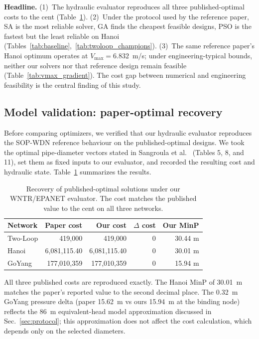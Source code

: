\documentclass[conference]{IEEEtran}
\begin{document}
\textbf{Headline.} (1)~The hydraulic evaluator reproduces all three published-optimal costs to the cent (Table~\ref{tab:validation}). (2)~Under the protocol used by the reference paper, SA is the most reliable solver, GA finds the cheapest feasible designs, PSO is the fastest but the least reliable on Hanoi (Tables~\ref{tab:baseline},~\ref{tab:twoloop_champions}). (3)~The same reference paper's Hanoi optimum operates at $V_{\max}=6.832$~m/s; under engineering-typical bounds, neither our solvers nor that reference design remain feasible (Table~\ref{tab:vmax_gradient}). The cost gap between numerical and engineering feasibility is the central finding of this study.

\subsection{Model validation: paper-optimal recovery}
\label{sec:validation}
Before comparing optimizers, we verified that our hydraulic evaluator reproduces the SOP-WDN reference behaviour on the published-optimal designs. We took the optimal pipe-diameter vectors stated in Sangroula et al.~\cite{sangroula2022} (Tables 5, 8, and 11), set them as fixed inputs to our evaluator, and recorded the resulting cost and hydraulic state. Table~\ref{tab:validation} summarizes the results.

\begin{table}[t]
\caption{Recovery of published-optimal solutions under our WNTR/EPANET evaluator. The cost matches the published value to the cent on all three networks.}
\label{tab:validation}
\centering
\begin{tabular}{lrrrr}
\toprule
Network & Paper cost & Our cost & $\Delta$ cost & Our MinP \\
\midrule
Two-Loop & 419{,}000 & 419{,}000 & 0 & 30.44 m \\
Hanoi    & 6{,}081{,}115.40 & 6{,}081{,}115.40 & 0 & 30.01 m \\
GoYang   & 177{,}010{,}359 & 177{,}010{,}359 & 0 & 15.94 m \\
\bottomrule
\end{tabular}
\end{table}

All three published costs are reproduced exactly. The Hanoi MinP of 30.01~m matches the paper's reported value to the second decimal place. The 0.32~m GoYang pressure delta (paper 15.62~m vs ours 15.94~m at the binding node) reflects the 86~m equivalent-head model approximation discussed in Sec.~\ref{sec:protocol}; this approximation does not affect the cost calculation, which depends only on the selected diameters.
\end{document}

